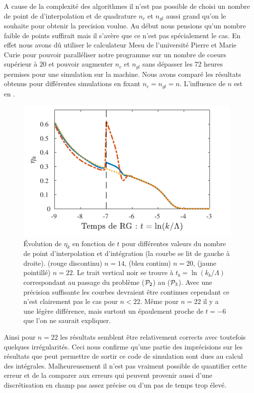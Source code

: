 \documentclass[10.5pt]{article}
\begin{document}
\begin{multicols}{2}
A cause de la complexité des algorithmes il n'est pas possible de choisi un nombre de point de d'interpolation et de quadrature $n_c$ et $n_{gl}$ aussi grand qu'on le souhaite pour obtenir la precision voulue. Au début nous pensions qu'un nombre faible de points suffirait mais il s'avère que ce n'est pas spécialement le cas. En effet nous avons dû utiliser le calculateur Mesu \cite{ wiki:xxx} de l'université Pierre et Marie Curie pour pouvoir paralléliser notre programme sur un nombre de coeurs supérieur à $20$ et pouvoir augmenter $n_c$ et $n_{gl}$ sans dépasser les 72 heures permises pour une simulation sur la machine. Nous avons comparé les résultats obtenus pour différentes simulations en fixant $n_c = n_{gl} = n$. L'influence de $n$ est en .

\begin{figure}[H]
\begin{center}
	\includegraphics[width=0.95\columnwidth]{EtakErrMesu.pdf}
\end{center}
\caption{Évolution de $\eta_k$ en fonction de $t$ pour différentes valeurs du nombre de point d'interpolation et d'intégration (la courbe se lit de gauche à droite). (rouge discontinu) $n=14$, (bleu continu) $n=20$, (jaune pointillé) $n=22$. Le trait vertical noir se trouve à $t_b = \ln(k_b/\Lambda)$ correspondant au passage du problème ($\mathcal{P}_2$) au ($\mathcal{P}_3$). Avec une précision suffisante les courbes devraient être continues cependant ce n'est clairement pas le cas pour $n<22$. Même pour $n=22$ il y a une légère différence, mais surtout un épaulement proche de $t=-6$ que l'on ne saurait expliquer.}
\label{fig:etaErr}
\end{figure}

Ainsi pour $n=22$ les résultats semblent être relativement corrects avec toutefois quelques irrégularités. Ceci nous confirme qu'une partie des imprécisions sur les résultats que peut permettre de sortir ce code de simulation sont dues au calcul des intégrales. Malheureusement il n'est pas vraiment possible de quantifier cette erreur et de la comparer aux erreurs qui peuvent provenir aussi d'une discrétisation en champ pas assez précise ou d'un pas de temps trop élevé. 




\end{multicols}
\end{document}
